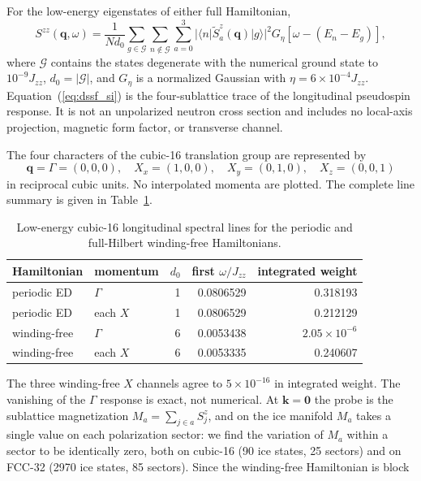 \documentclass[aps,prl,onecolumn,amsmath,amssymb]{revtex4-2}
\newcommand{\Jzz}{J_{zz}}
\newcommand{\bq}{\bm q}
\begin{document}
For the low-energy eigenstates of either full Hamiltonian,
\begin{equation}
 S^{zz}(\bq,\omega)=\frac{1}{Nd_0}
 \sum_{g\in\mathcal G}\sum_{n\notin\mathcal G}\sum_{a=0}^{3}
 |\langle n|\widetilde S_a^z(\bq)|g\rangle|^2
 G_\eta[\omega-(E_n-E_g)],
\label{eq:dssf_si}
\end{equation}
where $\mathcal G$ contains the states degenerate with the numerical ground
state to $10^{-9}\Jzz$, $d_0=|\mathcal G|$, and $G_\eta$ is a normalized
Gaussian with $\eta=6\times10^{-4}\Jzz$.  Equation~(\ref{eq:dssf_si}) is the
four-sublattice trace of the longitudinal pseudospin response.  It is not an
unpolarized neutron cross section and includes no local-axis projection,
magnetic form factor, or transverse channel.

The four characters of the cubic-16 translation group are represented by
\begin{equation}
 \bq=\Gamma=(0,0,0),\quad X_x=(1,0,0),\quad
 X_y=(0,1,0),\quad X_z=(0,0,1)
\end{equation}
in reciprocal cubic units.  No interpolated momenta are plotted.  The complete
line summary is given in Table~\ref{tab:dssf_lines}.
\begin{table}[htbp]
\caption{Low-energy cubic-16 longitudinal spectral lines for the periodic and
full-Hilbert winding-free Hamiltonians.}
\label{tab:dssf_lines}
\centering
\begin{tabular}{llrrr}
\toprule
Hamiltonian & momentum & $d_0$ & first $\omega/\Jzz$ & integrated weight\\
\midrule
periodic ED & $\Gamma$ & 1 & 0.0806529 & 0.318193\\
periodic ED & each $X$ & 1 & 0.0806529 & 0.212129\\
winding-free & $\Gamma$ & 6 & 0.0053438 & $2.05\times10^{-6}$\\
winding-free & each $X$ & 6 & 0.0053335 & 0.240607\\
\bottomrule
\end{tabular}
\end{table}
The three winding-free $X$ channels agree to $5\times10^{-16}$ in integrated
weight.  The vanishing of the $\Gamma$ response is exact, not numerical.  At
$\bm k=\bm 0$ the probe is the sublattice magnetization
$M_a=\sum_{j\in a}S^z_j$, and on the ice manifold $M_a$ takes a single value on
each polarization sector: we find the variation of $M_a$ within a sector to be
identically zero, both on cubic-16 (90 ice states, 25 sectors) and on FCC-32
(2970 ice states, 85 sectors).  Since the winding-free Hamiltonian is block
\end{document}

